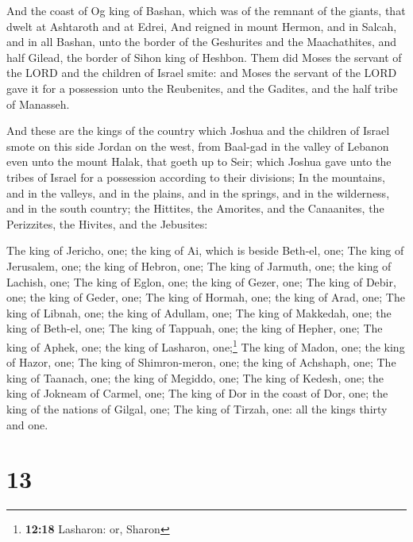 And the coast of Og king of Bashan, which was of the
remnant of the giants, that dwelt at Ashtaroth and at Edrei,
 And reigned in mount Hermon, and in Salcah, and in all
Bashan, unto the border of the Geshurites and the Maachathites, and half
Gilead, the border of Sihon king of Heshbon.  Them did
Moses the servant of the LORD and the children of Israel smite: and
Moses the servant of the LORD gave it for a possession unto the
Reubenites, and the Gadites, and the half tribe of Manasseh.

 And these are the kings of the country which Joshua and
the children of Israel smote on this side Jordan on the west, from
Baal-gad in the valley of Lebanon even unto the mount Halak, that goeth
up to Seir; which Joshua gave unto the tribes of Israel for a possession
according to their divisions;  In the mountains, and in
the valleys, and in the plains, and in the springs, and in the
wilderness, and in the south country; the Hittites, the Amorites, and
the Canaanites, the Perizzites, the Hivites, and the Jebusites:

 The king of Jericho, one; the king of Ai, which is beside
Beth-el, one;  The king of Jerusalem, one; the king of
Hebron, one;  The king of Jarmuth, one; the king of
Lachish, one;  The king of Eglon, one; the king of Gezer,
one;  The king of Debir, one; the king of Geder, one;
 The king of Hormah, one; the king of Arad, one;
 The king of Libnah, one; the king of Adullam, one;
 The king of Makkedah, one; the king of Beth-el, one;
 The king of Tappuah, one; the king of Hepher, one;
 The king of Aphek, one; the king of Lasharon,
one;\footnote{\textbf{12:18} Lasharon: or, Sharon}  The
king of Madon, one; the king of Hazor, one;  The king of
Shimron-meron, one; the king of Achshaph, one;  The king
of Taanach, one; the king of Megiddo, one;  The king of
Kedesh, one; the king of Jokneam of Carmel, one;  The
king of Dor in the coast of Dor, one; the king of the nations of Gilgal,
one;  The king of Tirzah, one: all the kings thirty and
one.

\hypertarget{section-12}{%
\section{13}\label{section-12}}

